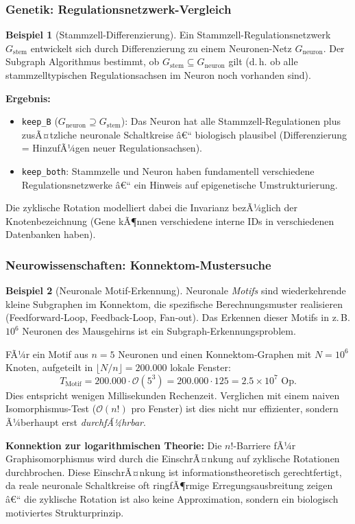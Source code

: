 ﻿\documentclass[12pt,a4paper,twoside]{article}
\theoremstyle{definition}
\newtheorem{beispiel}{Beispiel}[section]
\theoremstyle{plain}
\theoremstyle{remark}
\begin{document}
\subsubsection{Genetik: Regulationsnetzwerk-Vergleich}

\begin{beispiel}[Stammzell-Differenzierung]
Ein Stammzell-Regulationsnetzwerk $G_{\text{stem}}$ entwickelt
sich durch Differenzierung zu einem Neuronen-Netz
$G_{\text{neuron}}$.  Der Subgraph Algorithmus bestimmt,
ob $G_{\text{stem}} \subseteq G_{\text{neuron}}$ gilt
(d.\,h. ob alle stammzelltypischen Regulationsachsen
im Neuron noch vorhanden sind).

\textbf{Ergebnis:}
\begin{itemize}
  \item \texttt{keep\_B} ($G_{\text{neuron}} \supseteq G_{\text{stem}}$):
        Das Neuron hat alle Stammzell-Regulationen plus
        zusÃ¤tzliche neuronale Schaltkreise â€“ biologisch
        plausibel (Differenzierung = HinzufÃ¼gen neuer
        Regulationsachsen).
  \item \texttt{keep\_both}: Stammzelle und Neuron haben
        fundamentell verschiedene Regulationsnetzwerke â€“
        ein Hinweis auf epigenetische Umstrukturierung.
\end{itemize}
Die zyklische Rotation modelliert dabei die Invarianz
bezÃ¼glich der Knotenbezeichnung (Gene kÃ¶nnen verschiedene
interne IDs in verschiedenen Datenbanken haben).
\end{beispiel}

\subsubsection{Neurowissenschaften: Konnektom-Mustersuche}

\begin{beispiel}[Neuronale Motif-Erkennung]
Neuronale \emph{Motifs} sind wiederkehrende kleine
Subgraphen im Konnektom, die spezifische Berechnungsmuster
realisieren (Feedforward-Loop, Feedback-Loop, Fan-out).
Das Erkennen dieser Motifs in z.\,B. $10^6$ Neuronen
des Mausgehirns ist ein Subgraph-Erkennungsproblem.

FÃ¼r ein Motif aus $n = 5$ Neuronen und einen
Konnektom-Graphen mit $N = 10^6$ Knoten, aufgeteilt
in $\lfloor N/n \rfloor = 200.000$ lokale Fenster:
\[
  T_{\text{Motif}} = 200.000 \cdot \mathcal{O}(5^3)
                   = 200.000 \cdot 125
                   = 2.5 \times 10^7 \text{ Op.}
\]
Dies entspricht wenigen Millisekunden Rechenzeit.
Verglichen mit einem naiven Isomorphis\-mus-Test
($\mathcal{O}(n!)$ pro Fenster) ist dies nicht
nur effizienter, sondern Ã¼berhaupt erst \emph{durchfÃ¼hrbar}.

\textbf{Konnektion zur logarithmischen Theorie:}
Die $n!$-Barriere fÃ¼r Graphisomorphismus wird durch die
EinschrÃ¤nkung auf zyklische Rotationen durchbrochen.
Diese EinschrÃ¤nkung ist informationstheoretisch gerechtfertigt,
da reale neuronale Schaltkreise oft ringfÃ¶rmige
Erregungsausbreitung zeigen â€“ die zyklische Rotation
ist also keine Approximation, sondern ein biologisch
motiviertes Strukturprinzip.
\end{beispiel}
\end{document}
